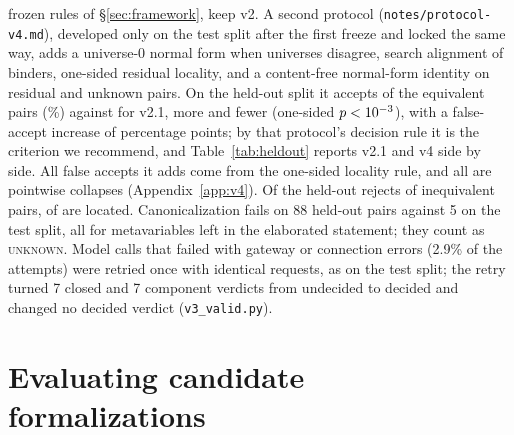 \documentclass[10pt]{article}
\theoremstyle{definition}
\newcommand{\V}[1]{\textsc{#1}}
\begin{document}
frozen rules of \S\ref{sec:framework}, keep v2. A second protocol (\texttt{notes/protocol-v4.md}),
developed only on the test split after the first freeze and locked the same way, adds a universe-0
normal form when universes disagree, search alignment of binders, one-sided residual locality, and
a content-free normal-form identity on residual and unknown pairs. On the held-out split it accepts
\HeldValidVfourAcc{} of the equivalent pairs (\HeldValidVfourAccPct\%) against
\HeldValidVtwoOneAcc{} for v2.1, \HeldValidHfiveB{} more and \HeldValidHfiveC{} fewer (one-sided
$p<10^{-3}$), with a false-accept increase of \HeldValidHfiveFAIncrease{} percentage points;
by that protocol's decision rule it is the criterion we recommend, and Table~\ref{tab:heldout}
reports v2.1 and v4 side by side. All \VfValidPubLAddU{} false accepts it adds come from the
one-sided locality rule, and all are pointwise collapses (Appendix~\ref{app:v4}). Of the held-out
rejects of inequivalent pairs,
\HeldValidVtwoLocated{} of \HeldValidVtwoRejU{} are located. Canonicalization fails on 88 held-out
pairs against 5 on the test split, all for metavariables left in the elaborated statement; they
count as \V{unknown}. Model calls that failed with gateway or connection errors (2.9\% of the
attempts) were retried once with identical requests, as on the test split; the retry turned 7
closed and 7 component verdicts from undecided to decided and changed no decided verdict
(\texttt{v3\_valid.py}).

\section{Evaluating candidate formalizations}\label{sec:exp}
\end{document}
